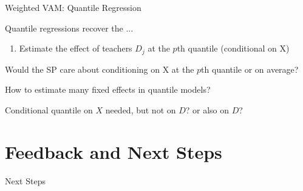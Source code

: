 \documentclass[t,aspectratio=169,11pt]{beamer}
\newenvironment{wideitemize}{\itemize\addtolength{\itemsep}{14pt}}{\enditemize}
\begin{document}
\begin{frame}{Weighted VAM: Quantile Regression}

\begin{wideitemize}

    \item Quantile regressions recover the ... \citep{}
    \begin{enumerate}
        \item Estimate the effect of teachers $D_j$ at the $p$th quantile (conditional on X)
        
    \end{enumerate}
    \item {\color{gray}{Is it really that simple?}}
    \item Would the SP care about conditioning on X at the $p$th quantile or on average?
    \item How to estimate many fixed effects in quantile models? 
    \item Conditional quantile on $X$ needed, but not on $D$? or also on $D$?

\end{wideitemize}
\end{frame}

\section{Feedback and Next Steps}

\begin{frame}{Next Steps}

\begin{wideitemize}
    \item 
\end{wideitemize}

\end{frame}
\end{document}
